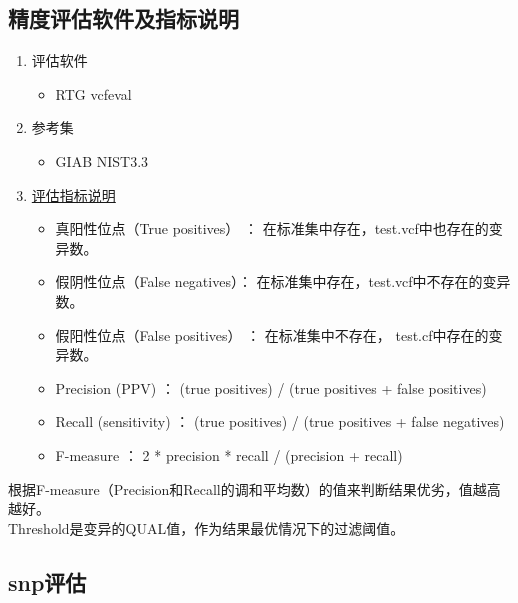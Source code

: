\documentclass[UTF8,10pt,a4paper]{ctexart}
\begin{document}
\subsection{精度评估软件及指标说明}
\begin{enumerate}
\item 评估软件
\begin{itemize}
\item RTG vcfeval
\end{itemize}
\item 参考集
\begin{itemize}
\item GIAB NIST3.3
\end{itemize}
\item \href{https://note.youdao.com/share/?token=170F71A3F2494D089B29E2AD944A6ECA&gid=12269890}{评估指标说明}
\begin{itemize}
\item 真阳性位点（True positives）  ：  在标准集中存在，test.vcf中也存在的变异数。 
\item 假阴性位点（False negatives）：  在标准集中存在，test.vcf中不存在的变异数。
\item 假阳性位点（False positives） ：  在标准集中不存在， test.cf中存在的变异数。
\item Precision (PPV) 		： (true positives) / (true positives + false positives) 
\item Recall (sensitivity)		： (true positives) / (true positives + false negatives) 
\item F-measure			： 2 * precision * recall / (precision + recall)
\end{itemize}
\end{enumerate}
根据F-measure（Precision和Recall的调和平均数）的值来判断结果优劣，值越高越好。\\
Threshold是变异的QUAL值，作为结果最优情况下的过滤阈值。

\subsection{snp评估}
\end{document}
